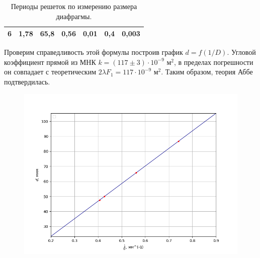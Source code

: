 \documentclass[a4paper,12pt]{article}
\begin{document}
\begin{table}[h!]
\begin{tabular}{|r|r|r|r|r|r|r|}
6                                                                        & 1,78                         & 65,8                          & 0,56                             & 0,01                                                                               & 0,4                                                                                 & 0,003                                    \\ \hline
\end{tabular}
\caption{Периоды решеток по измерению размера диафрагмы.}
\label{tab:my-table}
\end{table}
	
Проверим справедливость этой формулы построив график $d = f(1/D)$. Угловой коэффициент прямой из МНК $k = (117 \pm 3) \cdot 10^{-9} \text{ м}^2$, в пределах погрешности он совпадает с теоретическим $2\lambda F_1 = 117 \cdot 10^{-9} \text{ м}^2$. Таким образом, теория Аббе подтвердилась.
\begin{figure}[h!]
		\centering
		\includegraphics[scale = 0.6]{Figure_1.png}
	\end{figure}
\newpage
\end{document}
